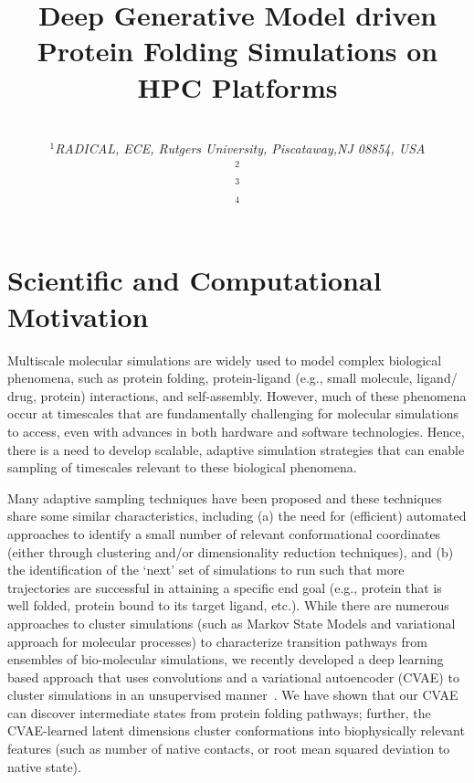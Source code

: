 \documentclass[conference,final]{IEEEtran}
\begin{document}
\title{Deep Generative Model driven Protein Folding Simulations on HPC Platforms}
\author{\\
   {\footnotesize{\emph{$^{1}$RADICAL, ECE, Rutgers University, Piscataway,NJ 08854, USA}}}\\
   \footnotesize{\emph{$^{2}$}}\\
   \footnotesize{\emph{$^{3}$}}\\
   \footnotesize{\emph{$^{4}$}\upp\upp\upp}
   }


\date{}
\maketitle

\section{Scientific  and Computational Motivation}

Multiscale molecular simulations are widely used to model complex biological phenomena, such as protein folding, protein-ligand (e.g., small molecule, ligand/ drug, protein) interactions, and self-assembly. However, much of these phenomena occur at timescales that are fundamentally challenging for molecular simulations to access, even with advances in both hardware and software technologies. Hence, there is a need to develop scalable, adaptive simulation strategies that can enable sampling of timescales relevant to these biological phenomena. 

Many adaptive sampling techniques have been proposed and these techniques share some similar characteristics, including (a) the need for (efficient) automated approaches to identify a small number of relevant conformational coordinates (either through clustering and/or dimensionality reduction techniques), and (b) the identification of the ‘next’ set of simulations to run such that more trajectories are successful in attaining a specific end goal (e.g., protein that is well folded, protein bound to its target ligand, etc.). While there are numerous approaches to cluster simulations (such as Markov State Models and variational approach for molecular processes) to characterize transition pathways from ensembles of bio-molecular simulations, we recently developed a deep learning based approach that uses convolutions and a variational autoencoder (CVAE) to cluster simulations in an unsupervised manner~\cite{bhowmik2018deep}. We have shown that our CVAE can discover intermediate states from protein folding pathways; further, the CVAE-learned latent dimensions cluster conformations into biophysically relevant features (such as number of native contacts, or root mean squared deviation to native state). 
\end{document}
